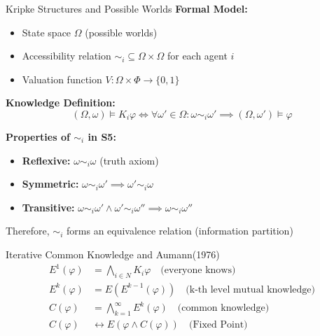 \documentclass[xcolor={x11names}]{beamer}
\begin{document}
\begin{frame}{Kripke Structures and Possible Worlds}
\textbf{Formal Model:}
\begin{itemize}
  \item State space $\Omega$ (possible worlds)
  \item Accessibility relation $\sim_i \subseteq \Omega \times \Omega$ for each agent $i$
  \item Valuation function $V: \Omega \times \Phi \to \{0,1\}$
\end{itemize}

\textbf{Knowledge Definition:}
\[
(\Omega, \omega) \models K_i \varphi \iff \forall \omega' \in \Omega: \omega \sim_i \omega' \implies (\Omega, \omega') \models \varphi
\]

\textbf{Properties of $\sim_i$ in S5:}
\begin{itemize}
  \item \textbf{Reflexive:} $\omega \sim_i \omega$ (truth axiom)
  \item \textbf{Symmetric:} $\omega \sim_i \omega' \implies \omega' \sim_i \omega$
  \item \textbf{Transitive:} $\omega \sim_i \omega' \land \omega' \sim_i \omega'' \implies \omega \sim_i \omega''$
\end{itemize}

Therefore, $\sim_i$ forms an equivalence relation (information partition)
\end{frame}

\begin{frame}{Iterative Common Knowledge and Aumann(1976)}
\begin{align*}
E^1(\varphi) &= \bigwedge_{i \in N} K_i \varphi \quad \text{(everyone knows)} \\
E^k(\varphi) &= E(E^{k-1}(\varphi)) \quad \text{(k-th level mutual knowledge)} \\
C(\varphi) &= \bigwedge_{k=1}^{\infty} E^k(\varphi) \quad \text{(common knowledge)} \\
C(\varphi) &\leftrightarrow E(\varphi \land C(\varphi)) \quad \text{(Fixed Point)}
\end{align*}

\begin{center}
\end{center}
\end{frame}
\end{document}

